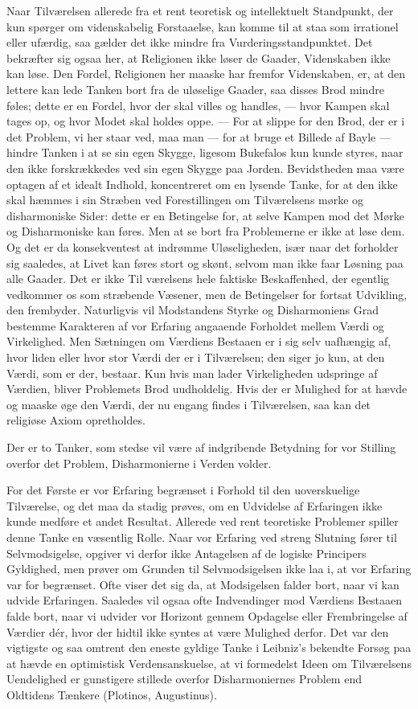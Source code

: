 \documentclass[12pt,a4paper,openany]{book}
\newcommand{\opage}[1]{\marginnote{\footnotesize\textit{[#1]}}}
\begin{document}
Naar Tilværelsen allerede fra et rent teoretisk og intellektuelt
Standpunkt, der kun spørger om videnskabelig Forstaaelse, kan komme til
at staa som irrationel eller ufærdig, saa gælder det ikke mindre fra
Vurderingsstandpunktet. Det bekræfter sig ogsaa her, at Religionen ikke
løser de Gaader, Videnskaben ikke kan løse. Den Fordel, Religionen her
maaske har fremfor Videnskaben, er, at den lettere kan lede Tanken bort
fra de uløselige Gaader, saa disses Brod mindre føles; dette er en
Fordel, hvor der skal villes og handles, --- hvor Kampen skal tages op,
og hvor Modet skal holdes oppe. --- For at slippe for den Brod, der er i
det Problem, vi her staar ved, maa man --- for at bruge et Billede af
Bayle --- hindre Tanken i at se sin egen Skygge, ligesom Bukefalos kun
kunde styres, naar den ikke forskrækkedes ved sin egen Skygge paa
Jorden. Bevidstheden maa være optagen af et idealt Indhold, koncentreret
om en lysende Tanke, for at den ikke skal hæmmes i sin Stræben ved
Forestillingen om Tilværelsens mørke og disharmoniske Sider: dette er en
Betingelse for, at selve Kampen mod det Mørke og Disharmoniske kan
føres. Men at se bort fra Problemerne er ikke at løse dem. Og det er da
konsekventest at indrømme Uløseligheden, især naar det forholder sig
saaledes, at Livet kan føres stort og skønt, selvom man ikke faar
Løsning paa alle Gaader. Det er ikke Til%
\opage{183}værelsens hele faktiske Beskaffenhed, der egentlig vedkommer
os som stræbende Væsener, men de Betingelser for fortsat Udvikling, den
frembyder. Naturligvis vil Modstandens Styrke og Disharmoniens Grad
bestemme Karakteren af vor Erfaring angaaende Forholdet mellem Værdi og
Virkelighed. Men Sætningen om Værdiens Bestaaen er i sig selv uafhængig
af, hvor liden eller hvor stor Værdi der er i Tilværelsen; den siger jo
kun, at den Værdi, som er der, bestaar. Kun hvis man lader Virkeligheden
udspringe af Værdien, bliver Problemets Brod uudholdelig. Hvis der er
Mulighed for at hævde og maaske øge den Værdi, der nu engang findes i
Tilværelsen, saa kan det religiøse Axiom opretholdes.

Der er to Tanker, som stedse vil være af indgribende Betydning for vor
Stilling overfor det Problem, Disharmonierne i Verden volder.

For det Første er vor Erfaring begrænset i Forhold til den uoverskuelige
Tilværelse, og det maa da stadig prøves, om en Udvidelse af Erfaringen
ikke kunde medføre et andet Resultat. Allerede ved rent teoretiske
Problemer spiller denne Tanke en væsentlig Rolle. Naar vor Erfaring ved
streng Slutning fører til Selvmodsigelse, opgiver vi derfor ikke
Antagelsen af de logiske Principers Gyldighed, men prøver om Grunden til
Selvmodsigelsen ikke laa i, at vor Erfaring var for begrænset. Ofte
viser det sig da, at Modsigelsen falder bort, naar vi kan udvide
Erfaringen. Saaledes vil ogsaa ofte Indvendinger mod Værdiens Bestaaen
falde bort, naar vi udvider vor Horizont gennem Opdagelse eller
Frembringelse af Værdier dér, hvor der hidtil ikke syntes at være
Mulighed derfor. Det var den vigtigste og saa omtrent den eneste gyldige
Tanke i Leibniz’s bekendte Forsøg paa at hævde en optimistisk
Verdensanskuelse, at vi formedelst Ideen om Tilværelsens Uendelighed er
gunstigere stillede overfor Disharmoniernes Problem end Oldtidens
Tænkere (Plotinos, Augustinus).
\end{document}
